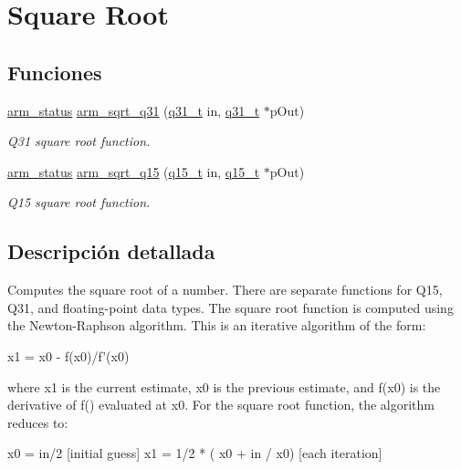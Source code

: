\hypertarget{group___s_q_r_t}{}\section{Square Root}
\label{group___s_q_r_t}
\subsection*{Funciones}
\begin{DoxyCompactItemize}
\item 
\hyperlink{arm__math_8h_a5e459c6409dfcd2927bb8a57491d7cf6}{arm\+\_\+status} \hyperlink{group___s_q_r_t_ga119e25831e141d734d7ef10636670058}{arm\+\_\+sqrt\+\_\+q31} (\hyperlink{arm__math_8h_adc89a3547f5324b7b3b95adec3806bc0}{q31\+\_\+t} in, \hyperlink{arm__math_8h_adc89a3547f5324b7b3b95adec3806bc0}{q31\+\_\+t} $\ast$p\+Out)
\begin{DoxyCompactList}\small\item\em Q31 square root function. \end{DoxyCompactList}\item 
\hyperlink{arm__math_8h_a5e459c6409dfcd2927bb8a57491d7cf6}{arm\+\_\+status} \hyperlink{group___s_q_r_t_ga5abe5ca724f3e15849662b03752c1238}{arm\+\_\+sqrt\+\_\+q15} (\hyperlink{arm__math_8h_ab5a8fb21a5b3b983d5f54f31614052ea}{q15\+\_\+t} in, \hyperlink{arm__math_8h_ab5a8fb21a5b3b983d5f54f31614052ea}{q15\+\_\+t} $\ast$p\+Out)
\begin{DoxyCompactList}\small\item\em Q15 square root function. \end{DoxyCompactList}\end{DoxyCompactItemize}


\subsection{Descripción detallada}
Computes the square root of a number. There are separate functions for Q15, Q31, and floating-\/point data types. The square root function is computed using the Newton-\/\+Raphson algorithm. This is an iterative algorithm of the form\+: 
\begin{DoxyPre}
     x1 = x0 - f(x0)/f'(x0)
\end{DoxyPre}
 where {\ttfamily x1} is the current estimate, {\ttfamily x0} is the previous estimate, and {\ttfamily f\textquotesingle{}(x0)} is the derivative of {\ttfamily f()} evaluated at {\ttfamily x0}. For the square root function, the algorithm reduces to\+: 
\begin{DoxyPre}
    x0 = in/2                         [initial guess]
    x1 = 1/2 * ( x0 + in / x0)        [each iteration]
\end{DoxyPre}
 

